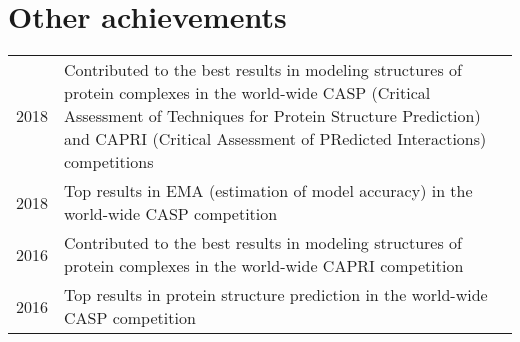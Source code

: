 \documentclass{article}
\begin{document}
\section*{Other achievements}
\begin{tabular}{p{}p{}}
2018 & Contributed to the best results in modeling structures of protein complexes
       in the world-wide CASP (Critical Assessment of Techniques for Protein Structure Prediction)
       and CAPRI (Critical Assessment of PRedicted Interactions) competitions \\
2018 & Top results in EMA (estimation of model accuracy)
       in the world-wide CASP competition \\
2016 & Contributed to the best results in modeling structures of protein complexes
       in the world-wide CAPRI competition \\
2016 & Top results in protein structure prediction
       in the world-wide CASP competition
\end{tabular}
\end{document}
